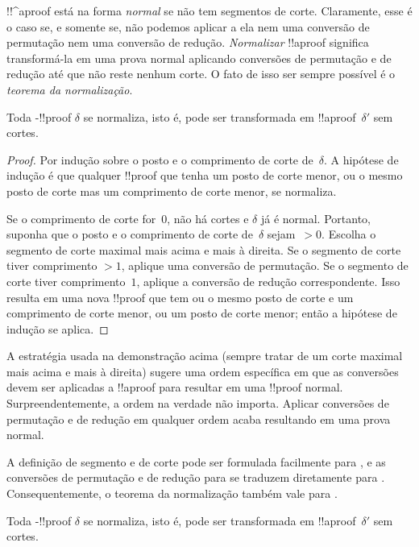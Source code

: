 \documentclass[../../../include/open-logic-section]{subfiles}
\begin{document}


!!^a{proof} está na forma \emph{normal} se não tem segmentos de corte.
Claramente, esse é o caso se, e somente se, não podemos aplicar a ela nem uma
conversão de permutação nem uma conversão de redução. \emph{Normalizar}
!!a{proof} significa transformá-la em uma prova normal aplicando
conversões de permutação e de redução até que não reste nenhum corte. O fato de
isso ser sempre possível é o \emph{teorema da normalização}.

\begin{thm} Toda -!!{proof}
$\delta$ se normaliza, isto é, pode ser transformada em
!!a{proof}~$\delta'$ sem cortes.
\end{thm}

\begin{proof}
  Por indução sobre o posto e o comprimento de corte de~$\delta$. A hipótese de
  indução é que qualquer !!{proof} que tenha um posto de corte menor, ou
  o mesmo posto de corte mas um comprimento de corte menor, se normaliza.

  Se o comprimento de corte for~$0$, não há cortes e $\delta$ já é
  normal. Portanto, suponha que o posto e o comprimento de corte de~$\delta$ sejam~$>
  0$. Escolha o segmento de corte maximal mais acima e mais à direita. Se o
  segmento de corte tiver comprimento $>1$, aplique uma conversão de permutação. Se o
  segmento de corte tiver comprimento~$1$, aplique a conversão de redução
  correspondente. Isso resulta em uma nova !!{proof} que tem ou o
  mesmo posto de corte e um comprimento de corte menor, ou um posto de corte menor; então
  a hipótese de indução se aplica.
\end{proof}

A estratégia usada na demonstração acima (sempre tratar de um
corte maximal mais acima e mais à direita) sugere uma ordem específica em que
as conversões devem ser aplicadas a !!a{proof} para resultar em uma
!!{proof} normal. Surpreendentemente, a ordem na verdade não
importa. Aplicar conversões de permutação e de redução em qualquer ordem
acaba resultando em uma prova normal.

A definição de segmento e de corte pode ser formulada facilmente para
, e as conversões de permutação e de redução para 
se traduzem diretamente para . Consequentemente, o teorema da
normalização também vale para .

\begin{thm} Toda -!!{proof}
$\delta$ se normaliza, isto é, pode ser transformada em
!!a{proof}~$\delta'$ sem cortes.
\end{thm}
\end{document}
